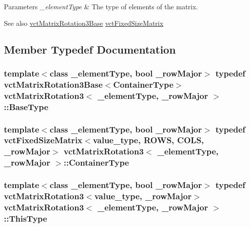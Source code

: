 \begin{DoxyParams}{Parameters}
{\em \+\_\+element\+Type} & The type of elements of the matrix.\\
\hline
\end{DoxyParams}
\begin{DoxySeeAlso}{See also}
\hyperlink{classvct_matrix_rotation3_base}{vct\+Matrix\+Rotation3\+Base} \hyperlink{classvct_fixed_size_matrix}{vct\+Fixed\+Size\+Matrix} 
\end{DoxySeeAlso}


\subsection{Member Typedef Documentation}
\hypertarget{classvct_matrix_rotation3_a548c9a746fae0bfb7b4b1466a872f4dd}{}
\subsubsection[{Base\+Type}]{\setlength{\rightskip}{0pt plus 5cm}template$<$class \+\_\+element\+Type, bool \+\_\+row\+Major$>$ typedef {\bf vct\+Matrix\+Rotation3\+Base}$<${\bf Container\+Type}$>$ {\bf vct\+Matrix\+Rotation3}$<$ \+\_\+element\+Type, \+\_\+row\+Major $>$\+::{\bf Base\+Type}}\label{classvct_matrix_rotation3_a548c9a746fae0bfb7b4b1466a872f4dd}
\hypertarget{classvct_matrix_rotation3_a1f8796d5368dbda35c3b57c6395b6dd0}{}
\subsubsection[{Container\+Type}]{\setlength{\rightskip}{0pt plus 5cm}template$<$class \+\_\+element\+Type, bool \+\_\+row\+Major$>$ typedef {\bf vct\+Fixed\+Size\+Matrix}$<$value\+\_\+type, {\bf R\+O\+W\+S}, {\bf C\+O\+L\+S}, \+\_\+row\+Major$>$ {\bf vct\+Matrix\+Rotation3}$<$ \+\_\+element\+Type, \+\_\+row\+Major $>$\+::{\bf Container\+Type}}\label{classvct_matrix_rotation3_a1f8796d5368dbda35c3b57c6395b6dd0}
\hypertarget{classvct_matrix_rotation3_adb3687819aa485dec149239047be7c50}{}
\subsubsection[{This\+Type}]{\setlength{\rightskip}{0pt plus 5cm}template$<$class \+\_\+element\+Type, bool \+\_\+row\+Major$>$ typedef {\bf vct\+Matrix\+Rotation3}$<$value\+\_\+type, \+\_\+row\+Major$>$ {\bf vct\+Matrix\+Rotation3}$<$ \+\_\+element\+Type, \+\_\+row\+Major $>$\+::{\bf This\+Type}}\label{classvct_matrix_rotation3_adb3687819aa485dec149239047be7c50}
\hypertarget{classvct_matrix_rotation3_a17e78ff6b4b66abf1f301c136652e503}{}
